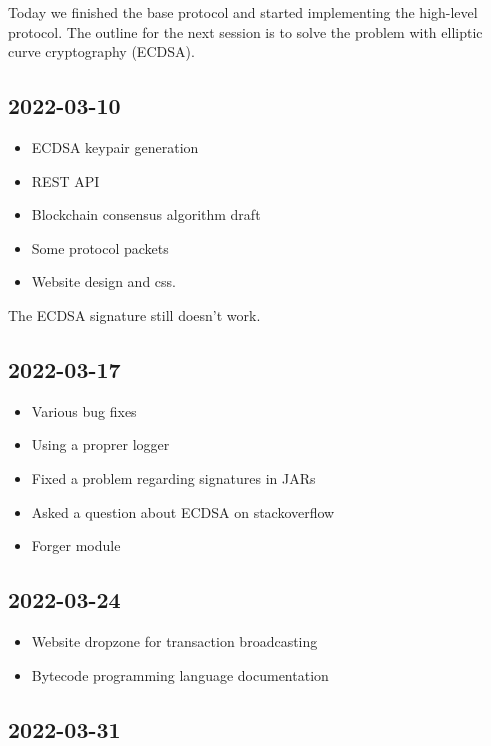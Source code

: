 \documentclass{article}
\begin{document}
Today we finished the base protocol and started implementing the high-level protocol.
The outline for the next session is to solve the problem with elliptic curve cryptography (ECDSA).

\subsection*{2022-03-10}

\begin{itemize}
    \item ECDSA keypair generation
    \item REST API
    \item Blockchain consensus algorithm draft
    \item Some protocol packets
    \item Website design and css.
\end{itemize}

The ECDSA signature still doesn't work.

\subsection*{2022-03-17}

\begin{itemize}
    \item Various bug fixes
    \item Using a proprer logger
    \item Fixed a problem regarding signatures in JARs
    \item Asked a question about ECDSA on stackoverflow
    \item Forger module
\end{itemize}

\subsection*{2022-03-24}

\begin{itemize}
    \item Website dropzone for transaction broadcasting
    \item Bytecode programming language documentation
\end{itemize}

\subsection*{2022-03-31}
\end{document}
